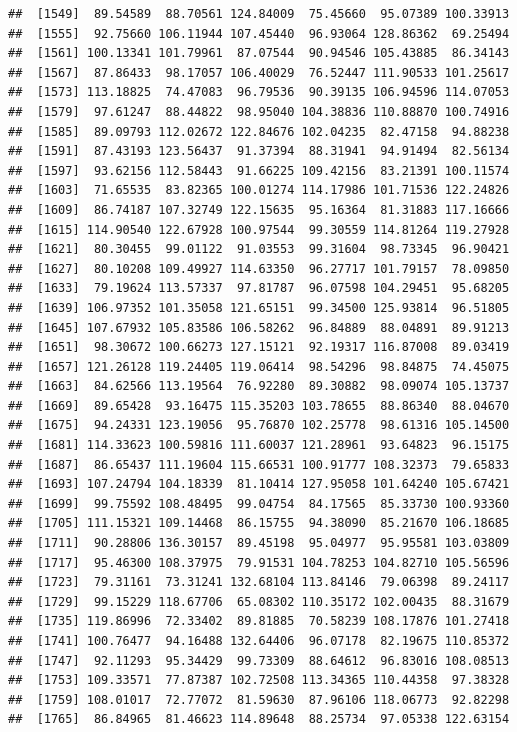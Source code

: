 \documentclass[
]{article}
\begin{document}
\begin{verbatim}
##  [1549]  89.54589  88.70561 124.84009  75.45660  95.07389 100.33913
##  [1555]  92.75660 106.11944 107.45440  96.93064 128.86362  69.25494
##  [1561] 100.13341 101.79961  87.07544  90.94546 105.43885  86.34143
##  [1567]  87.86433  98.17057 106.40029  76.52447 111.90533 101.25617
##  [1573] 113.18825  74.47083  96.79536  90.39135 106.94596 114.07053
##  [1579]  97.61247  88.44822  98.95040 104.38836 110.88870 100.74916
##  [1585]  89.09793 112.02672 122.84676 102.04235  82.47158  94.88238
##  [1591]  87.43193 123.56437  91.37394  88.31941  94.91494  82.56134
##  [1597]  93.62156 112.58443  91.66225 109.42156  83.21391 100.11574
##  [1603]  71.65535  83.82365 100.01274 114.17986 101.71536 122.24826
##  [1609]  86.74187 107.32749 122.15635  95.16364  81.31883 117.16666
##  [1615] 114.90540 122.67928 100.97544  99.30559 114.81264 119.27928
##  [1621]  80.30455  99.01122  91.03553  99.31604  98.73345  96.90421
##  [1627]  80.10208 109.49927 114.63350  96.27717 101.79157  78.09850
##  [1633]  79.19624 113.57337  97.81787  96.07598 104.29451  95.68205
##  [1639] 106.97352 101.35058 121.65151  99.34500 125.93814  96.51805
##  [1645] 107.67932 105.83586 106.58262  96.84889  88.04891  89.91213
##  [1651]  98.30672 100.66273 127.15121  92.19317 116.87008  89.03419
##  [1657] 121.26128 119.24405 119.06414  98.54296  98.84875  74.45075
##  [1663]  84.62566 113.19564  76.92280  89.30882  98.09074 105.13737
##  [1669]  89.65428  93.16475 115.35203 103.78655  88.86340  88.04670
##  [1675]  94.24331 123.19056  95.76870 102.25778  98.61316 105.14500
##  [1681] 114.33623 100.59816 111.60037 121.28961  93.64823  96.15175
##  [1687]  86.65437 111.19604 115.66531 100.91777 108.32373  79.65833
##  [1693] 107.24794 104.18339  81.10414 127.95058 101.64240 105.67421
##  [1699]  99.75592 108.48495  99.04754  84.17565  85.33730 100.93360
##  [1705] 111.15321 109.14468  86.15755  94.38090  85.21670 106.18685
##  [1711]  90.28806 136.30157  89.45198  95.04977  95.95581 103.03809
##  [1717]  95.46300 108.37975  79.91531 104.78253 104.82710 105.56596
##  [1723]  79.31161  73.31241 132.68104 113.84146  79.06398  89.24117
##  [1729]  99.15229 118.67706  65.08302 110.35172 102.00435  88.31679
##  [1735] 119.86996  72.33402  89.81885  70.58239 108.17876 101.27418
##  [1741] 100.76477  94.16488 132.64406  96.07178  82.19675 110.85372
##  [1747]  92.11293  95.34429  99.73309  88.64612  96.83016 108.08513
##  [1753] 109.33571  77.87387 102.72508 113.34365 110.44358  97.38328
##  [1759] 108.01017  72.77072  81.59630  87.96106 118.06773  92.82298
##  [1765]  86.84965  81.46623 114.89648  88.25734  97.05338 122.63154

\end{verbatim}
\end{document}
